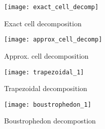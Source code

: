 \begin{figure}[t] 
  \label{fig:cellDec_typess} 
  \begin{minipage}[b]{0.5\linewidth}
    \centering
    \texttt{[image: exact\_cell\_decomp]}
    \caption{Exact cell decomposition}
    \label{fig:cellDec_pic1}
    \vspace{4ex}%
  \end{minipage}
  \begin{minipage}[b]{0.5\linewidth}
    \centering
    \texttt{[image: approx\_cell\_decomp]}
    \caption{Approx. cell decomposition}
    \label{fig:cellDec_pic2}
    \vspace{4ex}
  \end{minipage}
  \begin{minipage}[b]{0.5\linewidth}
    \centering
    \texttt{[image: trapezoidal\_1]}
    \caption{Trapezoidal decomposition} 
    \label{fig:cellDec_pic3}
    \vspace{4ex}
  \end{minipage}
  \begin{minipage}[b]{0.5\linewidth}
    \centering
    \texttt{[image: boustrophedon\_1]}
    \caption{Boustrophedon decompostion}
    \label{fig:cellDec_pic4}
    \vspace{4ex}%
  \end{minipage} 
\end{figure}